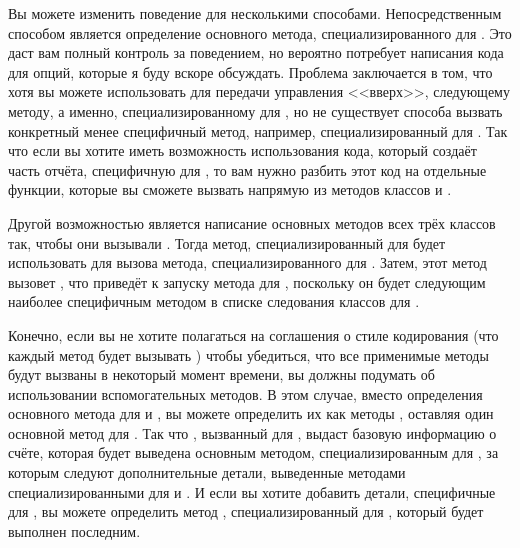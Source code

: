 Вы можете изменить поведение  для 
несколькими способами.  Непосредственным способом является определение основного метода,
специализированного для .  Это даст вам полный контроль за
поведением, но вероятно потребует написания кода для опций, которые я буду вскоре
обсуждать.  Проблема заключается в том, что хотя вы можете использовать
 для передачи управления <<вверх>>, следующему методу, а именно,
специализированному для , но не существует способа вызвать
конкретный менее специфичный метод, например, специализированный для
.  Так что если вы хотите иметь возможность использования кода,
который создаёт часть отчёта, специфичную для , то вам нужно разбить
этот код на отдельные функции, которые вы сможете вызвать напрямую из методов
 классов  и .

Другой возможностью является написание основных методов всех трёх классов так, чтобы они
вызывали .  Тогда метод, специализированный для
 будет использовать  для вызова метода,
специализированного для .  Затем, этот метод вызовет
, что приведёт к запуску метода для ,
поскольку он будет следующим наиболее специфичным методом в списке следования классов для
.

Конечно, если вы не хотите полагаться на соглашения о стиле кодирования (что каждый метод
будет вызывать ) чтобы убедиться, что все применимые методы будут
вызваны в некоторый момент времени, вы должны подумать об использовании вспомогательных
методов.  В этом случае, вместо определения основного метода  для
 и , вы можете определить их как методы
, оставляя один основной метод для .  Так что
, вызванный для , выдаст базовую
информацию о счёте, которая будет выведена основным методом, специализированным для
, за которым следуют дополнительные детали, выведенные методами
 специализированными для  и . И
если вы хотите добавить детали, специфичные для , вы можете
определить метод , специализированный для ,
который будет выполнен последним.

